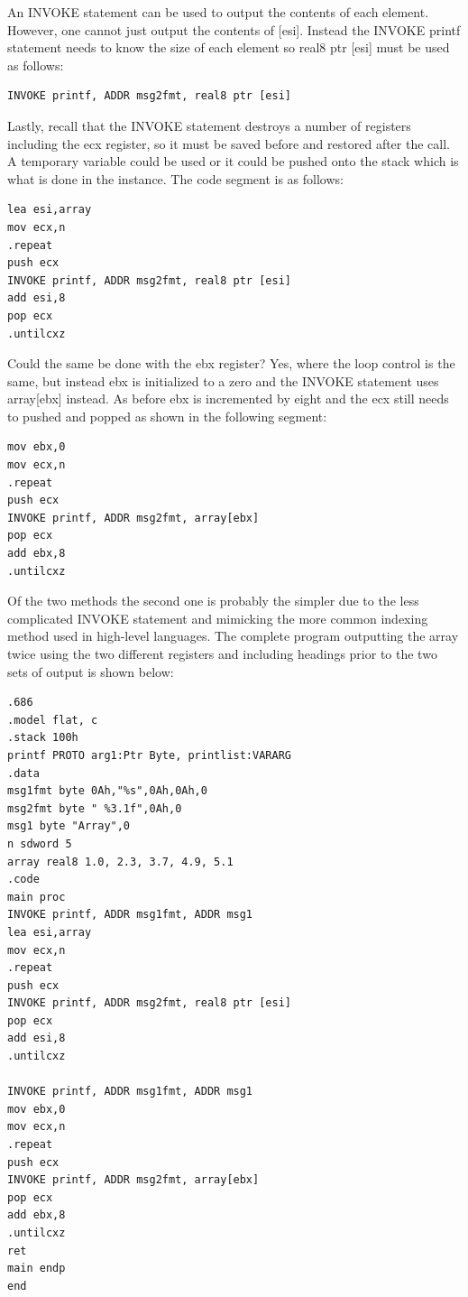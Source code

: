 \documentclass[10pt]{book}
\begin{document}
An INVOKE statement can be used to output the contents of each element. However, one cannot just output the contents of [esi]. Instead the INVOKE printf statement needs to know the size of each element so real8 ptr [esi] must be used as follows:

\begin{verbatim}
INVOKE printf, ADDR msg2fmt, real8 ptr [esi]
\end{verbatim}

Lastly, recall that the INVOKE statement destroys a number of registers including the ecx register, so it must be saved before and restored after the call. A temporary variable could be used or it could be pushed onto the stack which is what is done in the instance. The code segment is as follows:

\begin{verbatim}
lea esi,array
mov ecx,n
.repeat
push ecx
INVOKE printf, ADDR msg2fmt, real8 ptr [esi]
add esi,8
pop ecx
.untilcxz
\end{verbatim}

Could the same be done with the ebx register? Yes, where the loop control is the same, but instead ebx is initialized to a zero and the INVOKE statement uses array[ebx] instead. As before ebx is incremented by eight and the ecx still needs to pushed and popped as shown in the following segment:

\begin{verbatim}
mov ebx,0
mov ecx,n
.repeat
push ecx
INVOKE printf, ADDR msg2fmt, array[ebx]
pop ecx
add ebx,8
.untilcxz
\end{verbatim}

Of the two methods the second one is probably the simpler due to the less complicated INVOKE statement and mimicking the more common indexing method used in high-level languages. The complete program outputting the array twice using the two different registers and including headings prior to the two sets of output is shown below:

\begin{verbatim}
.686
.model flat, c
.stack 100h
printf PROTO arg1:Ptr Byte, printlist:VARARG
.data
msg1fmt byte 0Ah,"%s",0Ah,0Ah,0
msg2fmt byte " %3.1f",0Ah,0
msg1 byte "Array",0
n sdword 5
array real8 1.0, 2.3, 3.7, 4.9, 5.1
.code
main proc
INVOKE printf, ADDR msg1fmt, ADDR msg1
lea esi,array
mov ecx,n
.repeat
push ecx
INVOKE printf, ADDR msg2fmt, real8 ptr [esi]
pop ecx
add esi,8
.untilcxz

INVOKE printf, ADDR msg1fmt, ADDR msg1
mov ebx,0
mov ecx,n
.repeat
push ecx
INVOKE printf, ADDR msg2fmt, array[ebx]
pop ecx
add ebx,8
.untilcxz
ret
main endp
end
\end{verbatim}
\end{document}
